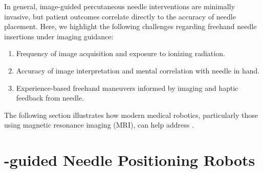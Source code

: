 
In general, image-guided percutaneous needle interventions are minimally invasive, but patient outcomes correlate directly to the accuracy of needle placement. Here, we highlight the following challenges regarding freehand needle insertions under imaging guidance:
\begin{enumerate}
\item Frequency of image acquisition and exposure to ionizing radiation.
\item Accuracy of image interpretation and mental correlation with needle in hand.
\item Experience-based freehand maneuvers informed by imaging and haptic feedback from needle.
\end{enumerate}

The following section illustrates how modern medical robotics, particularly those using magnetic resonance imaging (MRI), can help address .

\section{-guided Needle Positioning Robots}
\label{sec:image-guided-needle-positioning-robots}

